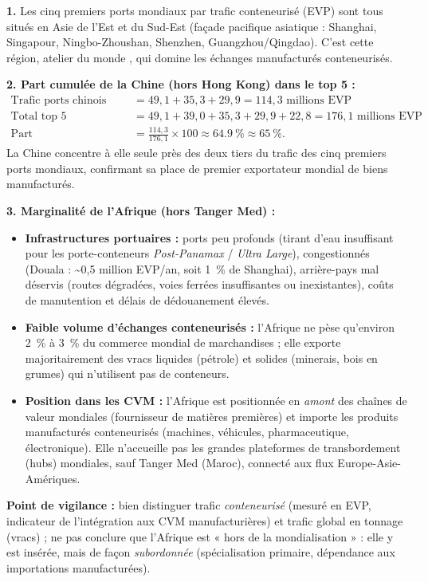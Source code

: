 \documentclass[11pt]{article}
\newcommand{\cle}[1]{{\popxbold\color{popdark}#1}}
\begin{document}
\begin{corrige}
\textbf{1.} Les cinq premiers ports mondiaux par trafic conteneurisé (EVP) sont tous situés en \cle{Asie de l'Est et du Sud-Est} (façade pacifique asiatique : Shanghai, Singapour, Ningbo-Zhoushan, Shenzhen, Guangzhou/Qingdao). C'est cette région, \og atelier du monde \fg{}, qui domine les échanges manufacturés conteneurisés.

\textbf{2. Part cumulée de la Chine (hors Hong Kong) dans le top 5 :}
\begin{align*}
\text{Trafic ports chinois (Shanghai, Ningbo, Shenzhen)} &= 49,1 + 35,3 + 29,9 = 114,3 \text{ millions EVP} \\
\text{Total top 5} &= 49,1 + 39,0 + 35,3 + 29,9 + 22,8 = 176,1 \text{ millions EVP} \\
\text{Part} &= \frac{114,3}{176,1} \times 100 \approx \SI{64,9}{\%} \approx \SI{65}{\%}.
\end{align*}
La Chine concentre à elle seule près des deux tiers du trafic des cinq premiers ports mondiaux, confirmant sa place de premier exportateur mondial de biens manufacturés.

\textbf{3. Marginalité de l'Afrique (hors Tanger Med) :}
\begin{itemize}
    \item \textbf{Infrastructures portuaires :} ports peu profonds (tirant d'eau insuffisant pour les porte-conteneurs \emph{Post-Panamax} / \emph{Ultra Large}), congestionnés (Douala : \textasciitilde 0,5 million EVP/an, soit \SI{1}{\%} de Shanghai), arrière-pays mal déservis (routes dégradées, voies ferrées insuffisantes ou inexistantes), coûts de manutention et délais de dédouanement élevés.
    \item \textbf{Faible volume d'échanges conteneurisés :} l'Afrique ne pèse qu'environ \SI{2}{\%} à \SI{3}{\%} du commerce mondial de marchandises ; elle exporte majoritairement des vracs liquides (pétrole) et solides (minerais, bois en grumes) qui n'utilisent pas de conteneurs.
    \item \textbf{Position dans les CVM :} l'Afrique est positionnée en \emph{amont} des chaînes de valeur mondiales (fournisseur de matières premières) et importe les produits manufacturés conteneurisés (machines, véhicules, pharmaceutique, électronique). Elle n'accueille pas les grandes plateformes de transbordement (hubs) mondiales, sauf Tanger Med (Maroc), connecté aux flux Europe-Asie-Amériques.
\end{itemize}
\textbf{Point de vigilance :} bien distinguer trafic \emph{conteneurisé} (mesuré en EVP, indicateur de l'intégration aux CVM manufacturières) et trafic global en tonnage (vracs) ; ne pas conclure que l'Afrique est « hors de la mondialisation » : elle y est insérée, mais de façon \emph{subordonnée} (spécialisation primaire, dépendance aux importations manufacturées).
\end{corrige}
\end{document}
